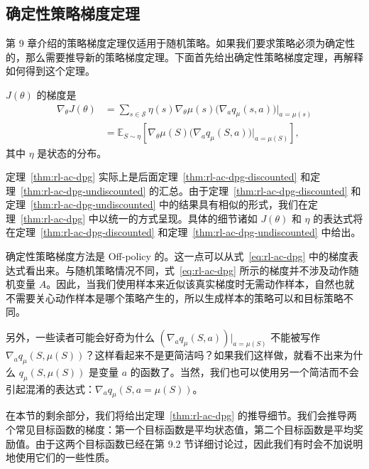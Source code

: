 \subsection{确定性策略梯度定理}
\label{sec:rl-ac-dpg-theorem}

第 9 章介绍的策略梯度定理仅适用于随机策略。如果我们要求策略必须为确定性的，那么需要推导新的策略梯度定理。下面首先给出确定性策略梯度定理，再解释如何得到这个定理。

\begin{theorem}[确定性策略梯度定理]\label{thm:rl-ac-dpg}
$J(\theta)$ 的梯度是
\begin{equation}
\begin{aligned}
\nabla_{\theta} J(\theta) &= \sum_{s \in \mathcal{S}} \eta(s) \nabla_{\theta} \mu(s) \big( \nabla_{a} q_{\mu}(s, a) \big) \big|_{a = \mu(s)} \\
&= \mathbb{E}_{S \sim \eta} \left[ \nabla_{\theta} \mu(S) \big( \nabla_{a} q_{\mu}(S, a) \big) \big|_{a = \mu(S)} \right],
\end{aligned}
\label{eq:rl-ac-dpg}
\end{equation}
其中 $\eta$ 是状态的分布。
\end{theorem}

定理~\ref{thm:rl-ac-dpg} 实际上是后面定理~\ref{thm:rl-ac-dpg-discounted} 和定理~\ref{thm:rl-ac-dpg-undiscounted} 的汇总。由于定理~\ref{thm:rl-ac-dpg-discounted} 和定理~\ref{thm:rl-ac-dpg-undiscounted} 中的结果具有相似的形式，我们在定理~\ref{thm:rl-ac-dpg} 中以统一的方式呈现。具体的细节诸如 $J(\theta)$ 和 $\eta$ 的表达式将在定理~\ref{thm:rl-ac-dpg-discounted} 和定理~\ref{thm:rl-ac-dpg-undiscounted} 中给出。

确定性策略梯度方法是 Off-policy 的。这一点可以从式~\eqref{eq:rl-ac-dpg} 中的梯度表达式看出来。与随机策略情况不同，式~\eqref{eq:rl-ac-dpg} 所示的梯度并不涉及动作随机变量 $A$。因此，当我们使用样本来近似该真实梯度时无需动作样本，自然也就不需要关心动作样本是哪个策略产生的，所以生成样本的策略可以和目标策略不同。

另外，一些读者可能会好奇为什么 $\left( \nabla_{a} q_{\mu}(S, a) \right) |_{a = \mu(S)}$ 不能被写作 $\nabla_{a} q_{\mu}(S, \mu(S))$？这样看起来不是更简洁吗？如果我们这样做，就看不出来为什么 $q_{\mu}(S, \mu(S))$ 是变量 $a$ 的函数了。当然，我们也可以使用另一个简洁而不会引起混淆的表达式：$\nabla_{a} q_{\mu}(S, a = \mu(S))$。

在本节的剩余部分，我们将给出定理~\ref{thm:rl-ac-dpg} 的推导细节。我们会推导两个常见目标函数的梯度：第一个目标函数是平均状态值，第二个目标函数是平均奖励值。由于这两个目标函数已经在第 9.2 节详细讨论过，因此我们有时会不加说明地使用它们的一些性质。

